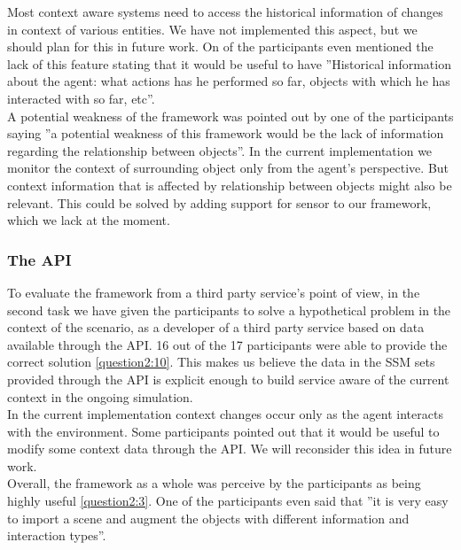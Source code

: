 Most context aware systems need to access the historical information of changes in context of various entities. We have not implemented this aspect, but we should plan for this in future work. On of the participants even mentioned the lack of this feature stating that it would be useful to have ''Historical information about the agent: what actions has he performed so far, objects with which he has interacted with so far, etc''.\\

A potential weakness of the framework was pointed out by one of the participants saying ''a potential weakness of this framework would be the lack of information regarding the relationship between objects''. In the current implementation we monitor the context of surrounding object only from the agent's perspective. But context information that is affected by relationship between objects might also be relevant. This could be solved by adding support for sensor to our framework, which we lack at the moment.\\

\subsubsection{The API} %
To evaluate the framework from a third party service's point of view, in the second task we have given the participants to solve a hypothetical problem in the context of the scenario, as a developer of a third party service based on data available through the API. 16 out of the 17 participants were able to provide the correct solution \ref{question2:10}. This makes us believe the data in the SSM sets provided through the API is explicit enough to build service aware of the current context in the ongoing simulation.\\

In the current implementation context changes occur only as the agent interacts with the environment. Some participants pointed out that it would be useful to modify some context data through the API. We will reconsider this idea in future work.\\

Overall, the framework as a whole was perceive by the participants as being highly useful \ref{question2:3}. One of the participants even said that ''it is very easy to import a scene and augment the objects with different information and interaction types''.\\


